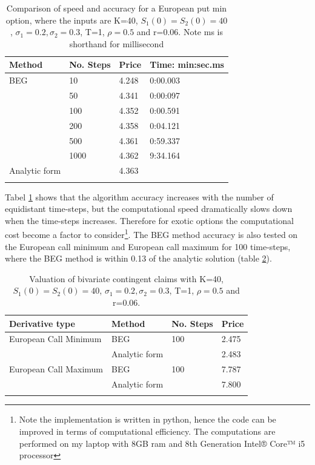 \begin{table}[th]
\caption{Comparison of speed and accuracy for a European put min option, where the inputs are K=40, $S_1(0)=S_2(0)=40$, $\sigma_1=0.2, \sigma_2=0.3$, T=1, $\rho=0.5$  and r=0.06. Note ms is shorthand for millisecond}
\label{tab:TradeOffEuroMin}
\centering
\begin{tabular}{l l l l}
\toprule
\textbf{Method} & \textbf{No. Steps} & \textbf{Price} & \textbf{Time: min:sec.ms} \\
\midrule
BEG & 10 & 4.248 & 0:00.003\\
& 50 & 4.341 & 0:00:097\\
& 100 & 4.352 & 0:00.591\\
& 200 & 4.358 & 0:04.121\\
& 500 & 4.361 & 0:59.337\\
& 1000 & 4.362 & 9:34.164\\
Analytic form & & 4.363 & \\
\bottomrule\\
\end{tabular}
\end{table}
Tabel \ref{tab:TradeOffEuroMin} shows that the algorithm accuracy increases with the number of equidistant time-steps, but the computational speed dramatically slows down when the time-steps increases. Therefore for exotic options the computational cost become a factor to consider\footnote{Note the implementation is written in python, hence the code can be improved in terms of computational efficiency. The computations are performed on my laptop with 8GB ram and 8th Generation Intel® Core™ i5 processor}. The BEG method accuracy is also tested on the European call minimum and European call maximum for 100 time-steps, where the BEG method is within 0.13 of the analytic solution (table \ref{tab:PriceEuropean}).\\
\begin{table}[th]
\caption{Valuation of bivariate contingent claims with K=40, $S_1(0)=S_2(0)=40$, $\sigma_1=0.2, \sigma_2=0.3$, T=1, $\rho=0.5$  and r=0.06.}
\label{tab:PriceEuropean}
\centering
\begin{tabular}{l l l l}
\toprule
\textbf{Derivative type} & \textbf{Method} & \textbf{No. Steps} & \textbf{Price} \\
\midrule
European Call Minimum & BEG & 100 & 2.475\\
& Analytic form & & 2.483\\
European Call Maximum & BEG & 100 & 7.787\\
& Analytic form & & 7.800\\
\bottomrule\\
\end{tabular}
\end{table}
 
